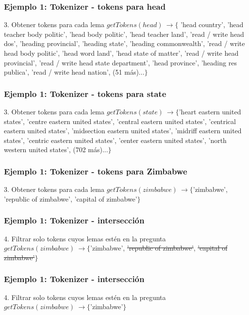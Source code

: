 \begin{frame}[t]
\frametitle{Ejemplo 1: Tokenizer - tokens para head}
3. Obtener tokens para cada lema \newline
    \Large{$
    getTokens(head)\ \rightarrow \{$ 'head country', 'head teacher body politic', 'head body politic', 'head teacher land', 'read / write head dos', 'heading provincial', 'heading state', 'heading commonwealth', 'read / write head body politic', 'head word land', 'head state of matter', 'read / write head provincial', 'read / write head state department', 'head province',  'heading res publica', 'read / write head nation', (51 más)...$\}$}
\end{frame}

\begin{frame}[t]
\frametitle{Ejemplo 1: Tokenizer - tokens para state}
3. Obtener tokens para cada lema \newline
  \Large{ $getTokens(state)\ \rightarrow  \{$'heart eastern united states', 'centre eastern united states', 'central eastern united states', 'centrical eastern united states', 'midsection eastern united states', 'midriff eastern united states', 'centric eastern united states', 'center eastern united states', 'north western united states', (702 más)...$\}$}
\end{frame}

\begin{frame}[t]
\frametitle{Ejemplo 1: Tokenizer - tokens para Zimbabwe}
3. Obtener tokens para cada lema \newline
  \Large{$getTokens(zimbabwe)\ \rightarrow \{$'zimbabwe', 'republic of zimbabwe', 'capital of zimbabwe'$\}$}

\end{frame}

\begin{frame}[t]
\frametitle{Ejemplo 1: Tokenizer - intersección}
4. Filtrar solo tokens cuyos lemas estén en la pregunta\newline
  \Large{$getTokens(zimbabwe)\ \rightarrow \{$'zimbabwe', {\color{red}\st{'republic of zimbabwe'}}, {\color{red}\st{'capital of zimbabwe'}}$\}$ }
\end{frame}


\begin{frame}[t]
\frametitle{Ejemplo 1: Tokenizer - intersección}
4. Filtrar solo tokens cuyos lemas estén en la pregunta\newline
  \Large{$getTokens(zimbabwe)\ \rightarrow \{$'zimbabwe'$\}$}
\end{frame}


